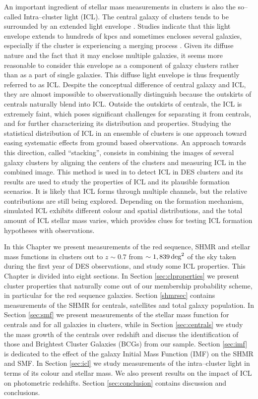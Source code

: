 {An important ingredient of stellar mass measurements in clusters is also the so--called Intra--cluster light (ICL). The central galaxy of clusters tends to be surrounded by an extended light envelope \citep{1951PASP...63...61Z, 1952PASP...64..242Z, 1964ApJ...140...35M, 1965ApJ...142.1364M}. Studies indicate that this light envelope extends to hundreds of kpcs and sometimes encloses several galaxies, especially if the cluster is experiencing a merging process \citep[see reviews in][]{2004cgpc.symp..277M,lauer}. Given its diffuse nature and the fact that it may enclose multiple galaxies, it seems more reasonable to consider this envelope as a component of galaxy clusters rather than as a part of single galaxies. This diffuse light envelope is thus frequently referred to as ICL. Despite the conceptual difference of central galaxy and ICL, they are almost impossible to observationally distinguish because the outskirts of centrals naturally blend into ICL. Outside the outskirts of centrals, the ICL is extremely faint, which poses significant challenges for separating it from centrals, and for further characterizing its distribution and properties. Studying the statistical distribution of ICL in an ensemble of clusters is one approach toward easing systematic effects from ground based observations. An approach towards this direction, called ``stacking'', consists in combining the images of several galaxy clusters by aligning the centers of the clusters and measuring ICL in the combined image. This method is used in \citet{icl} to detect ICL in DES clusters and its results are used to study the properties of ICL and its plausible formation scenarios. It is likely that ICL forms through multiple channels, but the relative contributions are still being explored. Depending on the formation mechanism, simulated ICL exhibits different colour and spatial distributions, and the total amount of ICL stellar mass varies, which provides clues for testing ICL formation hypotheses with observations.

In this Chapter we present measurements of the red sequence, SHMR and stellar mass functions in clusters out to $z\sim 0.7$ from $\sim 1,839\, {\rm deg}^2$ of the sky taken during the first year of DES observations, and study some ICL properties. 
This Chapter is divided into eight sections. In Section \ref{sec:clproperties} we present cluster properties that naturally come out of our membership probability scheme, in particular for the red sequence galaxies. Section \ref{shmrsec} contains measurements of the SHMR for centrals, satellites and total galaxy population. In Section \ref{sec:smf} we present measurements of the stellar mass function for centrals and for all galaxies in clusters, while in Section \ref{sec:centrals} we study the mass growth of the centrals over redshift and discuss the identification of those and Brightest Cluster Galaxies (BCGs) from our sample. Section \ref{sec:imf} is dedicated to the effect of the galaxy Initial Mass Function (IMF) on the SHMR and SMF. In Section \ref{sec:icl} we study measurements of the intra--cluster light in terms of its colour and stellar mass. We also present results on the impact of ICL on photometric redshifts. Section \ref{sec:conclusion} contains discussion and conclusions.

}
